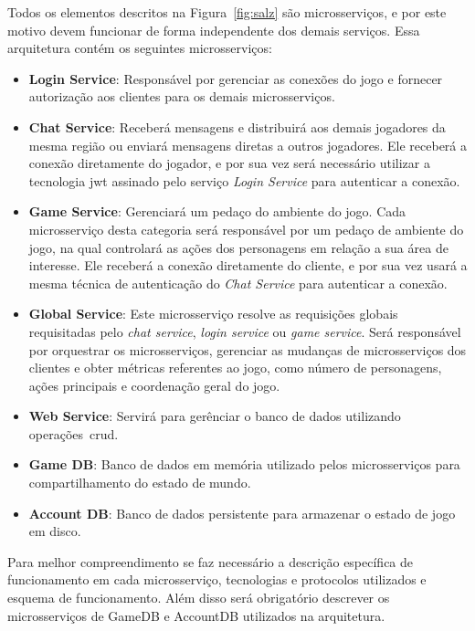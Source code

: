 Todos os elementos descritos na Figura~\ref{fig:salz} são microsserviços, e por este motivo devem funcionar de forma independente dos demais serviços.
%
Essa arquitetura contém os seguintes microsserviços:

\begin{itemize}
  \item \textbf{Login Service}: Responsável por gerenciar as conexões do jogo e fornecer autorização aos clientes para os demais microsserviços.
  \item \textbf{Chat Service}: Receberá mensagens e distribuirá aos demais jogadores da mesma região ou enviará mensagens diretas a outros jogadores. Ele receberá a conexão diretamente do jogador, e por sua vez será necessário utilizar a tecnologia \ac{jwt} assinado pelo serviço \textit{Login Service} para autenticar a conexão.
  \item \textbf{Game Service}: Gerenciará um pedaço do ambiente do jogo. Cada microsserviço desta categoria será responsável por um pedaço de ambiente do jogo, na qual controlará as ações dos personagens em relação a sua área de interesse. Ele receberá a conexão diretamente do cliente, e por sua vez usará a mesma técnica de autenticação do \textit{Chat Service} para autenticar a conexão.
  \item \textbf{Global Service}: Este microsserviço resolve as requisições globais requisitadas pelo \textit{chat service}, \textit{login service} ou \textit{game service}. Será responsável por orquestrar os microsserviços, gerenciar as mudanças de microsserviços dos clientes e obter métricas referentes ao jogo, como número de personagens, ações principais e coordenação geral do jogo.
  \item \textbf{Web Service}: Servirá para gerênciar o banco de dados utilizando operações~\ac{crud}.
  \item \textbf{Game DB}: Banco de dados em memória utilizado pelos microsserviços para compartilhamento do estado de mundo.
  \item \textbf{Account DB}: Banco de dados persistente para armazenar o estado de jogo em disco.
\end{itemize}


Para melhor compreendimento se faz necessário a descrição específica de funcionamento em cada microsserviço, tecnologias e protocolos utilizados e esquema de funcionamento.
%
Além disso será obrigatório descrever os microsserviços de GameDB e AccountDB utilizados na arquitetura.



